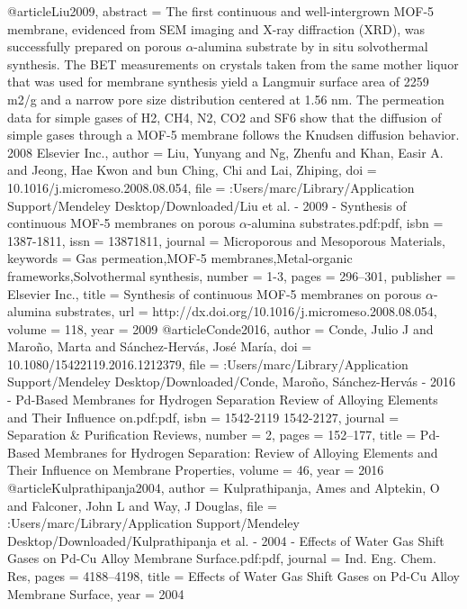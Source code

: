 @article{Liu2009,
abstract = {The first continuous and well-intergrown MOF-5 membrane, evidenced from SEM imaging and X-ray diffraction (XRD), was successfully prepared on porous $\alpha$-alumina substrate by in situ solvothermal synthesis. The BET measurements on crystals taken from the same mother liquor that was used for membrane synthesis yield a Langmuir surface area of 2259 m2/g and a narrow pore size distribution centered at 1.56 nm. The permeation data for simple gases of H2, CH4, N2, CO2 and SF6 show that the diffusion of simple gases through a MOF-5 membrane follows the Knudsen diffusion behavior. {\textcopyright} 2008 Elsevier Inc.},
author = {Liu, Yunyang and Ng, Zhenfu and Khan, Easir A. and Jeong, Hae Kwon and bun Ching, Chi and Lai, Zhiping},
doi = {10.1016/j.micromeso.2008.08.054},
file = {:Users/marc/Library/Application Support/Mendeley Desktop/Downloaded/Liu et al. - 2009 - Synthesis of continuous MOF-5 membranes on porous $\alpha$-alumina substrates.pdf:pdf},
isbn = {1387-1811},
issn = {13871811},
journal = {Microporous and Mesoporous Materials},
keywords = {Gas permeation,MOF-5 membranes,Metal-organic frameworks,Solvothermal synthesis},
number = {1-3},
pages = {296--301},
publisher = {Elsevier Inc.},
title = {{Synthesis of continuous MOF-5 membranes on porous $\alpha$-alumina substrates}},
url = {http://dx.doi.org/10.1016/j.micromeso.2008.08.054},
volume = {118},
year = {2009}
}
@article{Conde2016,
author = {Conde, Julio J and Maro{\~{n}}o, Marta and S{\'{a}}nchez-Herv{\'{a}}s, Jos{\'{e}} Mar{\'{i}}a},
doi = {10.1080/15422119.2016.1212379},
file = {:Users/marc/Library/Application Support/Mendeley Desktop/Downloaded/Conde, Maro{\~{n}}o, S{\'{a}}nchez-Herv{\'{a}}s - 2016 - Pd-Based Membranes for Hydrogen Separation Review of Alloying Elements and Their Influence on.pdf:pdf},
isbn = {1542-2119
1542-2127},
journal = {Separation {\&} Purification Reviews},
number = {2},
pages = {152--177},
title = {{Pd-Based Membranes for Hydrogen Separation: Review of Alloying Elements and Their Influence on Membrane Properties}},
volume = {46},
year = {2016}
}
@article{Kulprathipanja2004,
author = {Kulprathipanja, Ames and Alptekin, O and Falconer, John L and Way, J Douglas},
file = {:Users/marc/Library/Application Support/Mendeley Desktop/Downloaded/Kulprathipanja et al. - 2004 - Effects of Water Gas Shift Gases on Pd-Cu Alloy Membrane Surface.pdf:pdf},
journal = {Ind. Eng. Chem. Res},
pages = {4188--4198},
title = {{Effects of Water Gas Shift Gases on Pd-Cu Alloy Membrane Surface}},
year = {2004}
}
